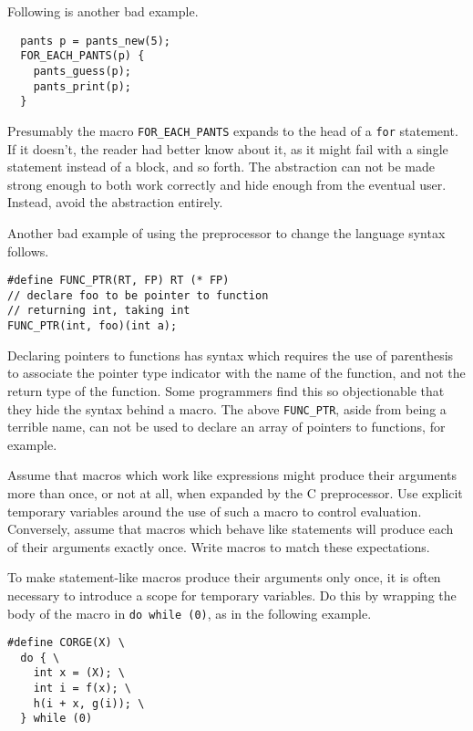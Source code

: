 \documentclass{lulu}
\newcommand{\code}[1]{\texttt{#1}\xspace}
\begin{document}
Following is another bad example.

\begin{samepage}
\begin{verbatim}
  pants p = pants_new(5);
  FOR_EACH_PANTS(p) {
    pants_guess(p);
    pants_print(p);
  }
\end{verbatim}
\end{samepage}

Presumably the macro \code{FOR\_EACH\_PANTS} expands to the head of a
\code{for} statement.  If it doesn't, the reader had better know about
it, as it might fail with a single statement instead of a block, and
so forth.  The abstraction can not be made strong enough to both work
correctly and hide enough from the eventual user.  Instead, avoid the
abstraction entirely.

Another bad example of using the preprocessor to change the language
syntax follows.

\begin{samepage}
\begin{verbatim}
#define FUNC_PTR(RT, FP) RT (* FP)
// declare foo to be pointer to function 
// returning int, taking int
FUNC_PTR(int, foo)(int a);
\end{verbatim}
\end{samepage}

Declaring pointers to functions has syntax which requires the use of
parenthesis to associate the pointer type indicator with the name of
the function, and not the return type of the function.  Some
programmers find this so objectionable that they hide the syntax
behind a macro.  The above \code{FUNC\_PTR}, aside from being a
terrible name, can not be used to declare an array of pointers to
functions, for example.

Assume that macros which work like expressions might produce their
arguments more than once, or not at all, when expanded by the C
preprocessor.  Use explicit temporary variables around the use of such
a macro to control evaluation.  Conversely, assume that macros which
behave like statements will produce each of their arguments exactly
once.  Write macros to match these expectations.

To make statement-like macros produce their arguments only once, it is
often necessary to introduce a scope for temporary variables.  Do this
by wrapping the body of the macro in \code{do while (0)}, as in the
following example.

\begin{samepage}
\begin{verbatim}
#define CORGE(X) \
  do { \
    int x = (X); \
    int i = f(x); \
    h(i + x, g(i)); \
  } while (0)
\end{verbatim}
\end{samepage}
\end{document}
